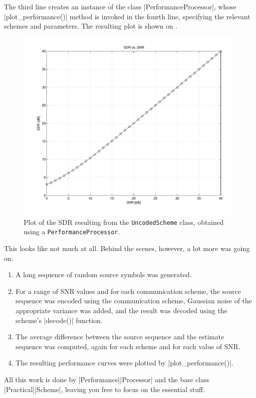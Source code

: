 The third line creates an instance of the class |PerformanceProcessor|, whose
|plot_performance()| method is invoked in the fourth line, specifying the
relevant schemes and parameters. The resulting plot is shown on
.

\begin{figure}
  \begin{center}
    \includegraphics[width=\textwidth]{figures/matlab/ex_uncoded.pdf}
  \end{center}
  \caption{Plot of the SDR resulting from the \texttt{UncodedScheme} class,
  obtained using a \texttt{PerformanceProcessor}.}
  \label{fig:uncoded}
\end{figure}

This looks like not much at all. Behind the scenes, however, a lot more was
going on:
\begin{enumerate}
  \item A long sequence of random source symbols was generated.
  \item For a range of SNR values and for each communication scheme, the source
    sequence was encoded using the communication scheme, Gaussian noise of the
    appropriate variance was added, and the result was decoded using the
    scheme's |decode()| function.
  \item The average difference between the source sequence and the estimate
    sequence was computed, again for each scheme and for each value of SNR. 
  \item The resulting performance curves were plotted by |plot_performance()|.
\end{enumerate}
All this work is done by |Performance|\-|Processor| and the base class
|Practical|\-|Scheme|, leaving you free to focus on the essential stuff.


